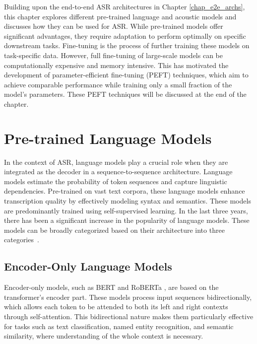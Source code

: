 Building upon the end-to-end ASR architectures in Chapter \ref{chap_e2e_archs}, this chapter explores different pre-trained language and acoustic models and discusses how they can be used for ASR. While pre-trained models offer significant advantages, they require adaptation to perform optimally on specific downstream tasks. Fine-tuning is the process of further training these models on task-specific data. However, full fine-tuning of large-scale models can be computationally expensive and memory intensive. This has motivated the development of parameter-efficient fine-tuning (PEFT) techniques, which aim to achieve comparable performance while training only a small fraction of the model's parameters. These PEFT techniques will be discussed at the end of the chapter.



\section{Pre-trained Language Models}

In the context of ASR, language models play a crucial role when they are integrated as the decoder in a sequence-to-sequence architecture. Language models estimate the probability of token sequences and capture linguistic dependencies. Pre-trained on vast text corpora, these language models enhance transcription quality by effectively modeling syntax and semantics. These models are predominantly trained using self-supervised learning. In the last three years, there has been a significant increase in the popularity of language models. These models can be broadly categorized based on their architecture into three categories~\cite{app14052074}.

\subsection{Encoder-Only Language Models}

Encoder-only models, such as BERT \cite{devlin2018bert} and RoBERTa \cite{liu2019roberta}, are based on the transformer's \cite{vaswani2017attention} encoder part. These models process input sequences bidirectionally, which allows each token to be attended to both its left and right contexts through self-attention. This bidirectional nature makes them particularly effective for tasks such as text classification, named entity recognition, and semantic similarity, where understanding of the whole context is necessary.

